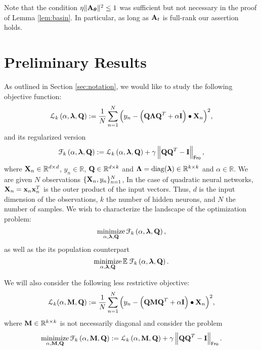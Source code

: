 \documentclass[11pt]{article}
\theoremstyle{plain}
\DeclareMathOperator*{\minimize}{minimize}
\DeclareMathOperator*{\diag}{diag}
\def\R{\mathbb{R}}
\theoremstyle{plain}
\numberwithin{equation}{section}
\numberwithin{lemma}{section}
\numberwithin{theorem}{section}
\numberwithin{corollary}{section}
\numberwithin{observation}{section}
\numberwithin{definition}{section}
\numberwithin{example}{section}
\begin{document}
\noindent Note that the condition $\eta \|\Mx{A}_{\V{\theta}}\|^2 \leq 1$ was sufficient but not necessary in the proof of Lemma \ref{lem:basin}. In particular, as long as $\Mx{A}_t$ is full-rank our assertion holds.  \section{Preliminary Results} \label{app:prelim}
\renewcommand{\theequation}{\Alph{section}.\arabic{equation}}
\renewcommand{\thefigure}{\Alph{section}.\arabic{figure}}



As outlined in Section \ref{sec:notation}, we would like to study the following objective function:
\begin{align} \label{eq:L_def}
\mathcal{L}_k \left(\alpha, {\Mx{\lambda}, \Mx{Q}} \right) := \frac{1}{N}\sum_{n = 1}^N \Big( y_n -  \left( \Mx{Q} \Mx{\Lambda} \Mx{Q}^T + \alpha \Mx{I} \right) \bullet \Mx{X}_n \Big)^2,
\end{align}
and its regularized version
\begin{equation}
\mathcal{F}_k\left(\alpha, {\V{\lambda},\Mx{Q}}\right):= \mathcal{L}_k \left(\alpha, {\V{\lambda},\Mx{Q}} \right) + \gamma \left\|\Mx{QQ}^T-\Mx{I}\right\|_{\sf Fro},
\end{equation}
where $\Mx{X}_n \in \mathbb{R}^{d \times d}$, $y_n \in \mathbb{R}$, $\Mx{Q} \in \mathbb{R}^{d \times k}$ and $\Mx{\Lambda} = \diag(\V{\lambda}) \in \mathbb{R}^{k \times k}$ and $\alpha \in \R$. We are given $N$ observations $\{\Mx{X}_n, y_n\}_{n=1}^N$, In the case of quadratic neural networks, $\Mx{X}_n = \V{x}_n \V{x}_n^T$ is the outer product of the input vectors. Thus, $d$ is the input dimension of the observations, $k$ the number of hidden neurons, and $N$ the number of samples.
We wish to characterize the landscape of the optimization problem:
\begin{equation} \label{eq:mseloss}
\minimize_{\alpha,\V{\lambda}, \Mx{Q}} \mathcal{F}_k\left(\alpha, {\V{\lambda},\Mx{Q}}\right),
\end{equation}
as well as the its population counterpart
\begin{equation} \label{eq:mseloss_population}
\minimize_{\alpha,\V{\lambda}, \Mx{Q}} \mathbb{E} \;\mathcal{F}_k\left(\alpha, {\V{\lambda},\Mx{Q}}\right).
\end{equation}

We will also consider the following less restrictive objective:
\begin{equation}
\mathcal{L}_k(\alpha,\Mx{M},\Mx{Q}) := \frac{1}{N}\sum_{n=1}^N \Big( y_n -\left(\Mx{QMQ}^T + \alpha \Mx{I} \right) \bullet \Mx{X}_n \Big)^2,
\end{equation}
where $\Mx{M} \in \R^{k \times k}$ is not necessarily diagonal and consider the problem 
\begin{equation} \label{eq:mseloss_M}
\minimize_{\alpha,\Mx{M}, \Mx{Q}} \mathcal{F}_k \left(\alpha, {\Mx{M},\Mx{Q}}\right):= \mathcal{L}_k \left(\alpha, {\Mx{M},\Mx{Q}} \right) + \gamma \left\|\Mx{QQ}^T-\Mx{I}\right\|_{\sf Fro}.
\end{equation}
\end{document}
